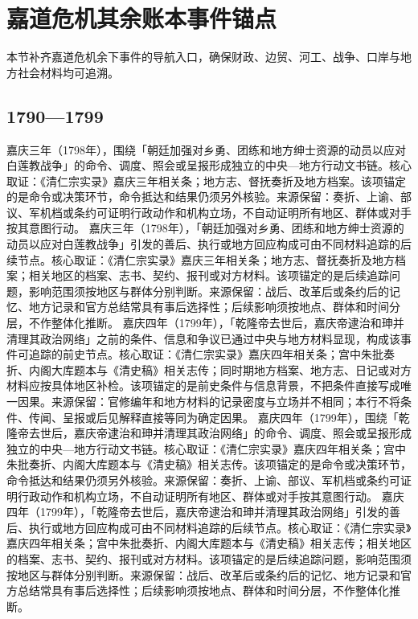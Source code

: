 \section{嘉道危机其余账本事件锚点}
本节补齐嘉道危机余下事件的导航入口，确保财政、边贸、河工、战争、口岸与地方社会材料均可追溯。
\subsection{1790—1799}
嘉庆三年（1798年），围绕「朝廷加强对乡勇、团练和地方绅士资源的动员以应对白莲教战争」的命令、调度、照会或呈报形成独立的中央—地方行动文书链。核心取证：《清仁宗实录》嘉庆三年相关条；地方志、督抚奏折及地方档案。该项锚定的是命令或决策环节，命令抵达和结果仍须另外核验。来源保留：奏折、上谕、部议、军机档或条约可证明行政动作和机构立场，不自动证明所有地区、群体或对手按其意图行动。
嘉庆三年（1798年），「朝廷加强对乡勇、团练和地方绅士资源的动员以应对白莲教战争」引发的善后、执行或地方回应构成可由不同材料追踪的后续节点。核心取证：《清仁宗实录》嘉庆三年相关条；地方志、督抚奏折及地方档案；相关地区的档案、志书、契约、报刊或对方材料。该项锚定的是后续追踪问题，影响范围须按地区与群体分别判断。来源保留：战后、改革后或条约后的记忆、地方记录和官方总结常具有事后选择性；后续影响须按地点、群体和时间分层，不作整体化推断。
嘉庆四年（1799年），「乾隆帝去世后，嘉庆帝逮治和珅并清理其政治网络」之前的条件、信息和争议已通过中央与地方材料显现，构成该事件可追踪的前史节点。核心取证：《清仁宗实录》嘉庆四年相关条；宫中朱批奏折、内阁大库题本与《清史稿》相关志传；同时期地方档案、地方志、日记或对方材料应按具体地区补检。该项锚定的是前史条件与信息背景，不把条件直接写成唯一因果。来源保留：官修编年和地方材料的记录密度与立场并不相同；本行不将条件、传闻、呈报或后见解释直接等同为确定因果。
嘉庆四年（1799年），围绕「乾隆帝去世后，嘉庆帝逮治和珅并清理其政治网络」的命令、调度、照会或呈报形成独立的中央—地方行动文书链。核心取证：《清仁宗实录》嘉庆四年相关条；宫中朱批奏折、内阁大库题本与《清史稿》相关志传。该项锚定的是命令或决策环节，命令抵达和结果仍须另外核验。来源保留：奏折、上谕、部议、军机档或条约可证明行政动作和机构立场，不自动证明所有地区、群体或对手按其意图行动。
嘉庆四年（1799年），「乾隆帝去世后，嘉庆帝逮治和珅并清理其政治网络」引发的善后、执行或地方回应构成可由不同材料追踪的后续节点。核心取证：《清仁宗实录》嘉庆四年相关条；宫中朱批奏折、内阁大库题本与《清史稿》相关志传；相关地区的档案、志书、契约、报刊或对方材料。该项锚定的是后续追踪问题，影响范围须按地区与群体分别判断。来源保留：战后、改革后或条约后的记忆、地方记录和官方总结常具有事后选择性；后续影响须按地点、群体和时间分层，不作整体化推断。
